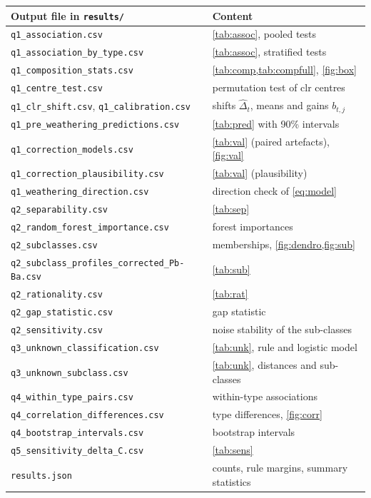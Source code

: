 \documentclass[11pt,a4paper]{article}
\begin{document}
\begin{center}
\small
\begin{tabular}{ll}
\toprule
Output file in \texttt{results/} & Content \\
\midrule
\texttt{q1\_association.csv} & \cref{tab:assoc}, pooled tests \\
\texttt{q1\_association\_by\_type.csv} & \cref{tab:assoc}, stratified tests \\
\texttt{q1\_composition\_stats.csv} & \cref{tab:comp,tab:compfull}, \cref{fig:box} \\
\texttt{q1\_centre\_test.csv} & permutation test of clr centres \\
\texttt{q1\_clr\_shift.csv}, \texttt{q1\_calibration.csv} & shifts $\hat\Delta_t$, means and gains $b_{t,j}$ \\
\texttt{q1\_pre\_weathering\_predictions.csv} & \cref{tab:pred} with 90\% intervals \\
\texttt{q1\_correction\_models.csv} & \cref{tab:val} (paired artefacts), \cref{fig:val} \\
\texttt{q1\_correction\_plausibility.csv} & \cref{tab:val} (plausibility) \\
\texttt{q1\_weathering\_direction.csv} & direction check of \cref{eq:model} \\
\texttt{q2\_separability.csv} & \cref{tab:sep} \\
\texttt{q2\_random\_forest\_importance.csv} & forest importances \\
\texttt{q2\_subclasses.csv} & memberships, \cref{fig:dendro,fig:sub} \\
\texttt{q2\_subclass\_profiles\_corrected\_Pb-Ba.csv} & \cref{tab:sub} \\
\texttt{q2\_rationality.csv} & \cref{tab:rat} \\
\texttt{q2\_gap\_statistic.csv} & gap statistic \\
\texttt{q2\_sensitivity.csv} & noise stability of the sub-classes \\
\texttt{q3\_unknown\_classification.csv} & \cref{tab:unk}, rule and logistic model \\
\texttt{q3\_unknown\_subclass.csv} & \cref{tab:unk}, distances and sub-classes \\
\texttt{q4\_within\_type\_pairs.csv} & within-type associations \\
\texttt{q4\_correlation\_differences.csv} & type differences, \cref{fig:corr} \\
\texttt{q4\_bootstrap\_intervals.csv} & bootstrap intervals \\
\texttt{q5\_sensitivity\_delta\_C.csv} & \cref{tab:sens} \\
\texttt{results.json} & counts, rule margins, summary statistics \\
\bottomrule
\end{tabular}
\end{center}
\end{document}
